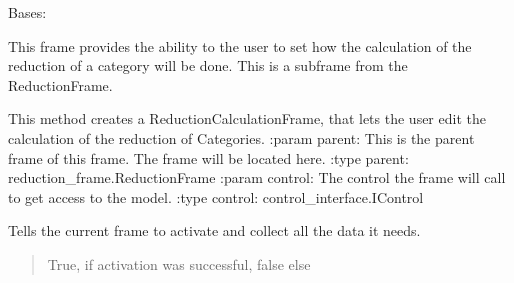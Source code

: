 \documentclass[letterpaper,10pt,english]{sphinxmanual}
\begin{document}
\begin{fulllineitems}
\label{\detokenize{apidoc/src.osm_configurator.view.utilityframes:src.osm_configurator.view.utilityframes.reduction_calculation_frame.ReductionCalculationFrame}}
\pysigstartsignatures
{}
\pysigstopsignatures
\sphinxAtStartPar
Bases: 

\sphinxAtStartPar
This frame provides the ability to the user to set how the calculation of the reduction of a category
will be done.
This is a subframe from the ReductionFrame.

\begin{fulllineitems}
\label{\detokenize{apidoc/src.osm_configurator.view.utilityframes:src.osm_configurator.view.utilityframes.reduction_calculation_frame.ReductionCalculationFrame.__init__}}
\pysigstartsignatures
{}
\pysigstopsignatures
\sphinxAtStartPar
This method creates a ReductionCalculationFrame, that lets the user edit the calculation of the reduction of
Categories.
:param parent: This is the parent frame of this frame. The frame will be located here.
:type parent: reduction\_frame.ReductionFrame
:param control: The control the frame will call to get access to the model.
:type control: control\_interface.IControl

\end{fulllineitems}


\begin{fulllineitems}
\label{\detokenize{apidoc/src.osm_configurator.view.utilityframes:src.osm_configurator.view.utilityframes.reduction_calculation_frame.ReductionCalculationFrame.activate}}
\pysigstartsignatures
{}
\pysigstopsignatures
\sphinxAtStartPar
Tells the current frame to activate and collect all the data it needs.
\begin{quote}\begin{description}
\sphinxAtStartPar
True, if activation was successful, false else

\sphinxAtStartPar
{}

\end{description}\end{quote}

\end{fulllineitems}


\end{fulllineitems}
\end{document}
